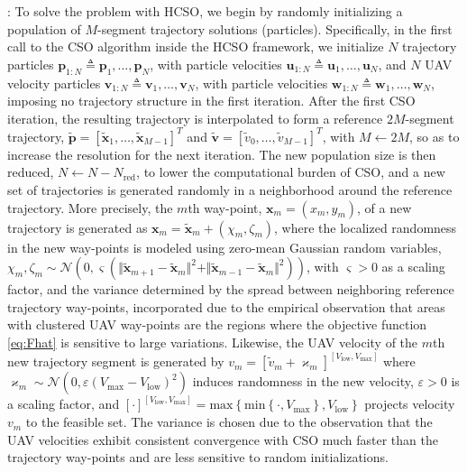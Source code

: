\documentclass[12pt, draftcls, onecolumn]{IEEEtran}
\theoremstyle{plain}
\theoremstyle{definition}
\theoremstyle{remark}
\begin{document}
: To solve the problem with HCSO, we begin by randomly initializing a population of $M$-segment trajectory solutions (particles). Specifically, in the first call to the CSO algorithm \cite{CSO} inside the HCSO framework, we initialize $N$ trajectory particles $\mathbf{p}_{1:N}{\triangleq}\mathbf{p}_{1},{\dots},\mathbf{p}_{N}$, with particle velocities $\mathbf{u}_{1:N}{\triangleq}\mathbf{u}_{1},{\dots},\mathbf{u}_{N}$, and $N$ UAV velocity particles $\mathbf{v}_{1:N}{\triangleq}\mathbf{v}_{1},{\dots},\mathbf{v}_{N}$, with particle velocities $\mathbf{w}_{1:N}{\triangleq}\mathbf{w}_{1},{\dots},\mathbf{w}_{N}$, imposing no trajectory structure in the first iteration. After the first CSO iteration, the resulting trajectory is interpolated to form a reference $2M$-segment trajectory, $\tilde{\mathbf{p}}{=}[\tilde{\mathbf{x}}_{1},{\dots},\tilde{\mathbf{x}}_{M{-}1}]^{T}$ and $\tilde{\mathbf{v}}{=}[\tilde{v}_{0},{\dots},\tilde{v}_{M{-}1}]^{T}$, with $M{\gets}2M$, so as to increase the resolution for the next iteration. The new population size is then reduced, $N{\gets}N{-}N_{\mathrm{red}}$, to lower the computational burden of CSO, and a new set of trajectories is generated randomly in a neighborhood around the reference trajectory. More precisely, the $m$th way-point, $\mathbf{x}_{m}{=}(x_{m},y_{m})$, of a new trajectory is generated as $\mathbf{x}_{m}{=}\tilde{\mathbf{x}}_{m}{+}(\chi_{m},\zeta_{m})$,
where the localized randomness in the new way-points is modeled using zero-mean Gaussian random variables, $\chi_{m},\zeta_{m}{\sim}\mathcal{N}\left(0,\varsigma\left(\Vert\tilde{\mathbf{x}}_{m{+}1}{-}\tilde{\mathbf{x}}_{m}\Vert^{2}{+}\Vert\tilde{\mathbf{x}}_{m{-}1}{-}\tilde{\mathbf{x}}_{m}\Vert^2\right)\right)$, with $\varsigma{>}0$ as a scaling factor, and the variance determined by the spread between neighboring reference trajectory way-points, incorporated due to the empirical observation that areas with clustered UAV way-points are the regions where the objective function \eqref{eq:Fhat} is sensitive to large variations. Likewise, the UAV velocity of the $m$th new trajectory segment is generated by $v_{m}{=}[\tilde{v}_{m}{+}\varkappa_{m}]^{[V_{\mathrm{low}},V_{\mathrm{max}}]}$
where $\varkappa_{m}{\sim}\mathcal{N}\left(0,\varepsilon\left(V_{\mathrm{max}}{-}V_{\mathrm{low}}\right)^{2}\right)$ induces randomness in the new velocity, $\varepsilon{>}0$ is a scaling factor, and $[\cdot]^{[V_{\mathrm{low}},V_{\mathrm{max}}]}{=}\mathrm{max}\left\{ \mathrm{min}\left\{\cdot,V_{\mathrm{max}}\right\},V_{\mathrm{low}}\right\}$ projects velocity $v_{m}$ to the feasible set. The variance is chosen due to the observation that the UAV velocities exhibit consistent convergence with CSO much faster than the trajectory way-points and are less sensitive to random initializations.
\end{document}
